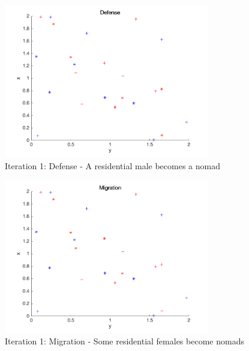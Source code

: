 \begin{figure}[H]
\begin{center}
\includegraphics[width=0.8\textwidth]{img/mdme/defense1}
\caption{Iteration 1: Defense - A residential male becomes a nomad}
\end{center}
\end{figure}

\begin{figure}[H]
\begin{center}
\includegraphics[width=0.8\textwidth]{img/mdme/migration1}
\caption{Iteration 1: Migration - Some residential females become nomads}
\end{center}
\end{figure}

